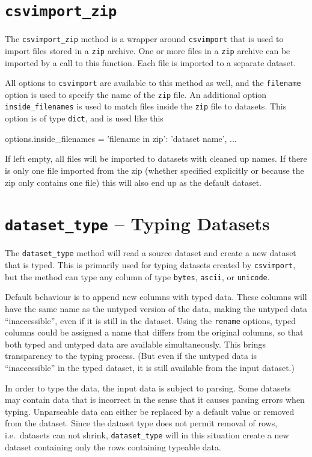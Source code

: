 \clearpage
\section{\texttt{csvimport\_zip}}
The \texttt{csvimport\_zip} method is a wrapper
around \texttt{csvimport} that is used to import files stored in
a \texttt{zip} archive.  One or more files in a \texttt{zip} archive
can be imported by a call to this function.  Each file is imported to
a separate dataset.

All options to \texttt{csvimport} are available to this method as
well, and the \texttt{filename} option is used to specify the name of
the \texttt{zip} file.  An additional option \texttt{inside\_filenames}
is used to match files inside the \texttt{zip} file to datasets.
This option is of type \texttt{dict}, and is used like this
\begin{python}
 options.inside_filenames = {'filename in zip': 'dataset name', ...}
\end{python}
If left empty, all files will be imported to datasets with cleaned up
names.  If there is only one file imported from the zip (whether
specified explicitly or because the zip only contains one file) this
will also end up as the default dataset.






\clearpage
\section{\texttt{dataset\_type} -- Typing Datasets}
The \texttt{dataset\_type} method will read a source dataset and
create a new dataset that is typed.  This is primarily used for typing
datasets created by \texttt{csvimport}, but the method can type any
column of type \texttt{bytes}, \texttt{ascii}, or \texttt{unicode}.

Default behaviour is to append new columns with typed data.  These
columns will have the same name as the untyped version of the data,
making the untyped data ``inaccessible'', even if it is still in the
dataset.  Using the \texttt{rename} options, typed columns could be
assigned a name that differs from the original columns, so that both
typed and untyped data are available simultaneously.  This brings
transparency to the typing process.  (But even if the untyped data is
``inaccessible'' in the typed dataset, it is still available from the
input dataset.)

In order to type the data, the input data is subject to parsing.  Some
datasets may contain data that is incorrect in the sense that it
causes parsing errors when typing.  Unparseable data can either be
replaced by a default value or removed from the dataset.  Since the
dataset type does not permit removal of rows, i.e.\ datasets can not
shrink, \texttt{dataset\_type} will in this situation create a new
dataset containing only the rows containing typeable data.








